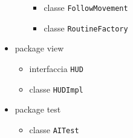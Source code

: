 \documentclass[a4paper,12pt]{report}
\begin{document}
\begin{itemize}
\begin{itemize}
\begin{itemize}
				\item classe \texttt{FollowMovement}
				\item classe \texttt{RoutineFactory}
				\end{itemize}
		\end{itemize}
	\item package view
		\begin{itemize}
			\item interfaccia \texttt{HUD}
			\item classe \texttt{HUDImpl}
		\end{itemize}
	\item package test
		\begin{itemize}
			\item classe \texttt{AITest}
		\end{itemize}
\end{itemize}
\end{document}
